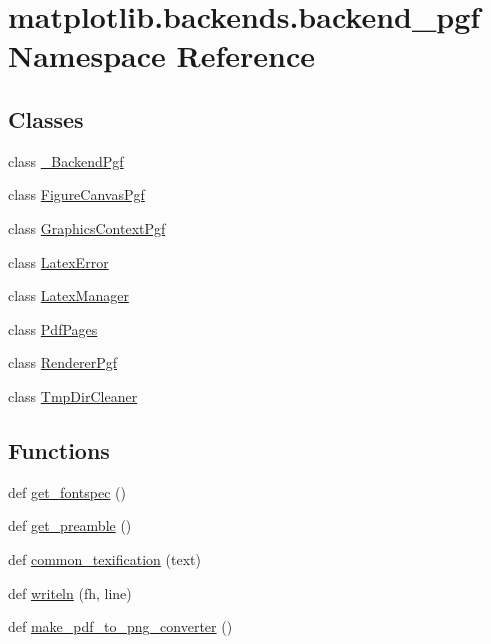 \hypertarget{namespacematplotlib_1_1backends_1_1backend__pgf}{}\section{matplotlib.\+backends.\+backend\+\_\+pgf Namespace Reference}
\label{namespacematplotlib_1_1backends_1_1backend__pgf}
\subsection*{Classes}
\begin{DoxyCompactItemize}
\item 
class \hyperlink{classmatplotlib_1_1backends_1_1backend__pgf_1_1__BackendPgf}{\+\_\+\+Backend\+Pgf}
\item 
class \hyperlink{classmatplotlib_1_1backends_1_1backend__pgf_1_1FigureCanvasPgf}{Figure\+Canvas\+Pgf}
\item 
class \hyperlink{classmatplotlib_1_1backends_1_1backend__pgf_1_1GraphicsContextPgf}{Graphics\+Context\+Pgf}
\item 
class \hyperlink{classmatplotlib_1_1backends_1_1backend__pgf_1_1LatexError}{Latex\+Error}
\item 
class \hyperlink{classmatplotlib_1_1backends_1_1backend__pgf_1_1LatexManager}{Latex\+Manager}
\item 
class \hyperlink{classmatplotlib_1_1backends_1_1backend__pgf_1_1PdfPages}{Pdf\+Pages}
\item 
class \hyperlink{classmatplotlib_1_1backends_1_1backend__pgf_1_1RendererPgf}{Renderer\+Pgf}
\item 
class \hyperlink{classmatplotlib_1_1backends_1_1backend__pgf_1_1TmpDirCleaner}{Tmp\+Dir\+Cleaner}
\end{DoxyCompactItemize}
\subsection*{Functions}
\begin{DoxyCompactItemize}
\item 
def \hyperlink{namespacematplotlib_1_1backends_1_1backend__pgf_adb98f2563be426cda28b667b2e172964}{get\+\_\+fontspec} ()
\item 
def \hyperlink{namespacematplotlib_1_1backends_1_1backend__pgf_a348e0ca0f559516e7d5c5c3f2b7d261c}{get\+\_\+preamble} ()
\item 
def \hyperlink{namespacematplotlib_1_1backends_1_1backend__pgf_aaff36e5d5138ce325d6a1324bb27bf51}{common\+\_\+texification} (text)
\item 
def \hyperlink{namespacematplotlib_1_1backends_1_1backend__pgf_a4697db49093c58fcb38cd7a9a0e9cfe3}{writeln} (fh, line)
\item 
def \hyperlink{namespacematplotlib_1_1backends_1_1backend__pgf_ad5e20809208d42c76007ad4921425f1a}{make\+\_\+pdf\+\_\+to\+\_\+png\+\_\+converter} ()
\end{DoxyCompactItemize}
